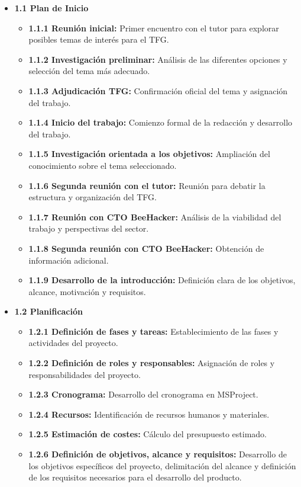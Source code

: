 \documentclass[a4paper, 11pt]{article}
\begin{document}
\begin{itemize}
    \item \textbf{1.1 Plan de Inicio}
    \begin{itemize}
        \item \textbf{1.1.1 Reunión inicial:} Primer encuentro con el tutor para explorar posibles temas de interés para el TFG.
        \item \textbf{1.1.2 Investigación preliminar:} Análisis de las diferentes opciones y selección del tema más adecuado.
        \item \textbf{1.1.3 Adjudicación TFG:} Confirmación oficial del tema y asignación del trabajo.
        \item \textbf{1.1.4 Inicio del trabajo:} Comienzo formal de la redacción y desarrollo del trabajo.
        \item \textbf{1.1.5 Investigación orientada a los objetivos:} Ampliación del conocimiento sobre el tema seleccionado.
        \item \textbf{1.1.6 Segunda reunión con el tutor:} Reunión para debatir la estructura y organización del TFG.
        \item \textbf{1.1.7 Reunión con CTO BeeHacker:} Análisis de la viabilidad del trabajo y perspectivas del sector.
        \item \textbf{1.1.8 Segunda reunión con CTO BeeHacker:} Obtención de información adicional.
        \item \textbf{1.1.9 Desarrollo de la introducción:} Definición clara de los objetivos, alcance, motivación y requisitos.
    \end{itemize}

    \item \textbf{1.2 Planificación}
    \begin{itemize}
        \item \textbf{1.2.1 Definición de fases y tareas:} Establecimiento de las fases y actividades del proyecto.
        \item \textbf{1.2.2 Definición de roles y responsables:} Asignación de roles y responsabilidades del proyecto.
        \item \textbf{1.2.3 Cronograma:} Desarrollo del cronograma en MSProject.
        \item \textbf{1.2.4 Recursos:} Identificación de recursos humanos y materiales.
        \item \textbf{1.2.5 Estimación de costes:} Cálculo del presupuesto estimado.
        \item \textbf{1.2.6 Definición de objetivos, alcance y requisitos:} Desarrollo de los objetivos específicos del proyecto, delimitación del alcance y definición de los requisitos necesarios para el desarrollo del producto.


\end{itemize}
\end{itemize}
\end{document}
